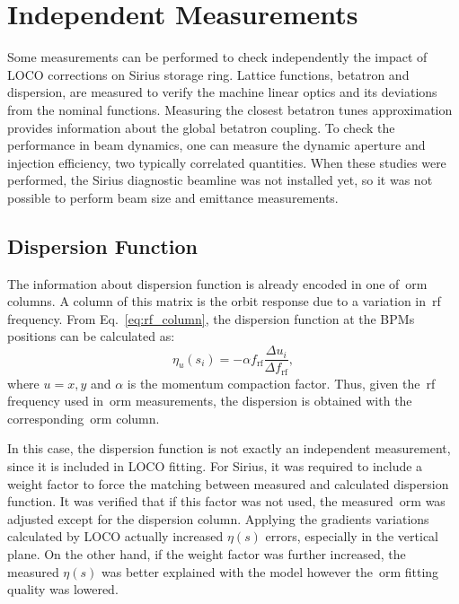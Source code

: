 \section{Independent Measurements}\label{sec:independent_meas}
Some measurements can be performed to check independently the impact of LOCO corrections on Sirius storage ring. Lattice functions, betatron and dispersion, are measured to verify the machine linear optics and its deviations from the nominal functions. Measuring the closest betatron tunes approximation provides information about the global betatron coupling. To check the performance in beam dynamics, one can measure the dynamic aperture and injection efficiency, two typically correlated quantities. When these studies were performed, the Sirius diagnostic beamline was not installed yet, so it was not possible to perform beam size and emittance measurements.

\subsection{Dispersion Function}
The information about dispersion function is already encoded in one of~\gls{orm} columns. A column of this matrix is the orbit response due to a variation in~\gls{rf} frequency. From Eq.~\eqref{eq:rf_column}, the dispersion function at the BPMs positions can be calculated as:
\begin{equation}
\eta_u(s_i) = -\alpha f_{\mathrm{rf}}\dfrac{\Delta u_i}{ \Delta f_{\mathrm{rf}}},
\end{equation}
where $u=x, y$ and $\alpha$ is the momentum compaction factor. Thus, given the~\gls{rf} frequency used in~\gls{orm} measurements, the dispersion is obtained with the corresponding~\gls{orm} column.

In this case, the dispersion function is not exactly an independent measurement, since it is included in LOCO fitting. For Sirius, it was required to include a weight factor to force the matching between measured and calculated dispersion function. It was verified that if this factor was not used, the measured~\gls{orm} was adjusted except for the dispersion column. Applying the gradients variations calculated by LOCO actually increased $\eta(s)$ errors, especially in the vertical plane. On the other hand, if the weight factor was further increased, the measured $\eta(s)$ was better explained with the model however the~\gls{orm} fitting quality was lowered.

